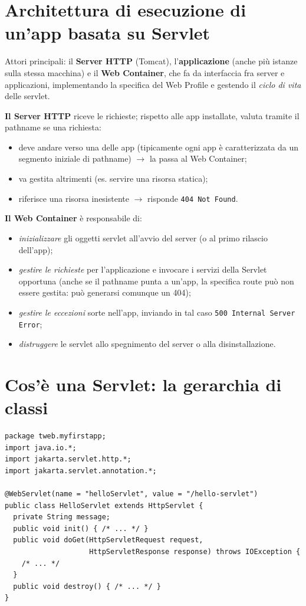 \section{Architettura di esecuzione di un'app basata su Servlet}

Attori principali: il \textbf{Server HTTP} (Tomcat), l'\textbf{applicazione} (anche pi\`u
istanze sulla stessa macchina) e il \textbf{Web Container}, che fa da interfaccia fra server
e applicazioni, implementando la specifica del Web Profile e gestendo il \emph{ciclo di vita}
delle servlet.

\textbf{Il Server HTTP} riceve le richieste; rispetto alle app installate, valuta tramite il
pathname se una richiesta:
\begin{itemize}
  \item deve andare verso una delle app (tipicamente ogni app \`e caratterizzata da un
        segmento iniziale di pathname) $\rightarrow$ la passa al Web Container;
  \item va gestita altrimenti (es. servire una risorsa statica);
  \item riferisce una risorsa inesistente $\rightarrow$ risponde \texttt{404 Not Found}.
\end{itemize}

\textbf{Il Web Container} \`e responsabile di:
\begin{itemize}
  \item \emph{inizializzare} gli oggetti servlet all'avvio del server (o al primo rilascio
        dell'app);
  \item \emph{gestire le richieste} per l'applicazione e invocare i servizi della Servlet
        opportuna (anche se il pathname punta a un'app, la specifica route pu\`o non essere
        gestita: pu\`o generarsi comunque un 404);
  \item \emph{gestire le eccezioni} sorte nell'app, inviando in tal caso
        \texttt{500 Internal Server Error};
  \item \emph{distruggere} le servlet allo spegnimento del server o alla disinstallazione.
\end{itemize}

\section{Cos'\`e una Servlet: la gerarchia di classi}

\begin{lstlisting}[style=java]
package tweb.myfirstapp;
import java.io.*;
import jakarta.servlet.http.*;
import jakarta.servlet.annotation.*;

@WebServlet(name = "helloServlet", value = "/hello-servlet")
public class HelloServlet extends HttpServlet {
  private String message;
  public void init() { /* ... */ }
  public void doGet(HttpServletRequest request,
                    HttpServletResponse response) throws IOException {
    /* ... */
  }
  public void destroy() { /* ... */ }
}
\end{lstlisting}

